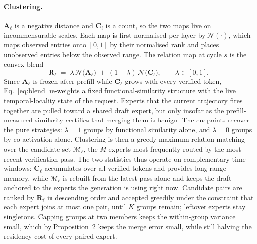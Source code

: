 \paragraph{Clustering.}
$\mathbf{A}_{\ell}$ is a negative distance and $\mathbf{C}_{\ell}$ is a
count, so the two maps live on incommensurable scales. Each map is first
normalised per layer by $\mathcal{N}(\cdot)$, which maps observed entries
onto $[0,1]$ by their normalised rank and places unobserved entries below
the observed range. The relation map at cycle $s$ is the convex blend
\begin{equation}
\mathbf{R}_{\ell} \;=\;
  \lambda\,\mathcal{N}\!\bigl(\mathbf{A}_{\ell}\bigr)
  \;+\;
  (1-\lambda)\,\mathcal{N}\!\bigl(\mathbf{C}_{\ell}\bigr),
\qquad \lambda \in [0,1].
\label{eq:blend}
\end{equation}
Since $\mathbf{A}_{\ell}$ is frozen after prefill while
$\mathbf{C}_{\ell}$ grows with every verified token,
Eq.~\eqref{eq:blend} re-weights a fixed functional-similarity structure
with the live temporal-locality state of the request. Experts that the
current trajectory fires together are pulled toward a shared draft
expert, but only insofar as the prefill-measured similarity certifies
that merging them is benign. The endpoints recover the pure strategies:
$\lambda{=}1$ groups by functional similarity alone, and $\lambda{=}0$
groups by co-activation alone. Clustering is then a greedy
maximum-relation matching over the candidate set $\mathcal{M}_{\ell}$,
the $M$ experts most frequently routed by the most recent verification
pass. The two statistics thus operate on complementary time windows:
$\mathbf{C}_{\ell}$ accumulates over all verified tokens and provides
long-range memory, while $\mathcal{M}_{\ell}$ is rebuilt from the latest
pass alone and keeps the draft anchored to the experts the generation is
using right now. Candidate pairs are
ranked by $\mathbf{R}_{\ell}$ in descending order and accepted greedily
under the constraint that each expert joins at most one pair, until $K$
groups remain; leftover experts stay singletons. Capping groups at two
members keeps the within-group variance small, which by Proposition~2
keeps the merge error small, while still halving the residency cost of
every paired expert.

